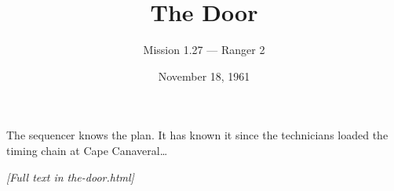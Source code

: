\documentclass[12pt]{article}
\title{\textbf{The Door}}
\author{Mission 1.27 --- Ranger 2}
\date{November 18, 1961}
\begin{document}
\maketitle
\noindent The sequencer knows the plan. It has known it since the technicians loaded the timing chain at Cape Canaveral\ldots

\medskip\noindent\textit{[Full text in the-door.html]}
\end{document}
